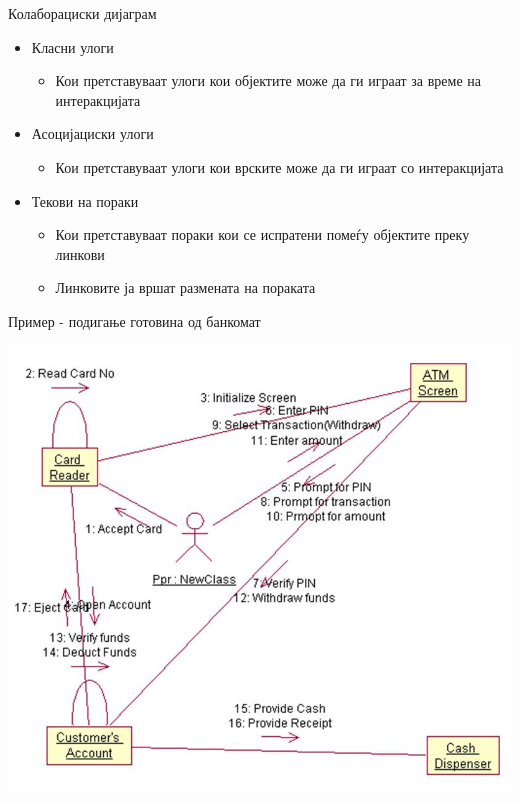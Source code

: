 \begin{frame}{Колаборациски дијаграм}
\begin{itemize}
  \item Класни улоги
\begin{itemize}
  \item Кои претставуваат улоги кои објектите може да ги играат за време на интеракцијата
\end{itemize}
  \item Асоцијациски улоги
\begin{itemize}
  \item Кои претставуваат улоги кои врските може да ги играат со интеракцијата
\end{itemize}
  \item Текови на пораки
\begin{itemize}
  \item Кои претставуваат пораки кои се испратени помеѓу објектите преку линкови
  \item Линковите ја вршат размената на пораката
\end{itemize}
\end{itemize}
\end{frame}

\begin{frame}{Пример - подигање готовина од банкомат}
\begin{center}
    \includegraphics[scale=0.2]{images/colaboration.jpg}
\end{center}
\end{frame}

